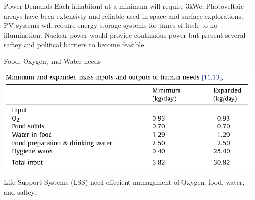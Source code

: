 \documentclass{beamer}
\begin{document}
 

\begin{frame}{Power Demands}
Each inhabitant at a minimum will require 3kWe. Photovoltaic arrays have been extensivly and reliable used in space and surface explorations. PV systems will require energy storage systems for times of little to no illumination. Nuclear power would provide continuous power but present several saftey and political barriers to become feasible\cite{Hickman}.
\end{frame}

    
    
  \begin{frame}{Food, Oxygen, and Water needs}
      \begin{center}
             \includegraphics[width= \textwidth]{Human_needs.eps}   
      \end{center}  
              Life Support Systems (LSS) need effecient managament of Oxygen, food, water, and saftey.\cite{Belz}

    \end{frame}
\end{document}
